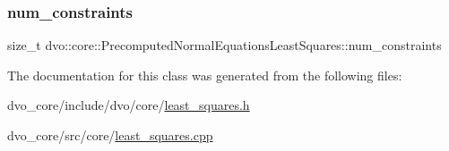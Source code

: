 \subsubsection{\texorpdfstring{num\+\_\+constraints}{num\_constraints}}
{\footnotesize\ttfamily size\+\_\+t dvo\+::core\+::\+Precomputed\+Normal\+Equations\+Least\+Squares\+::num\+\_\+constraints}



The documentation for this class was generated from the following files\+:\begin{DoxyCompactItemize}
\item 
dvo\+\_\+core/include/dvo/core/\mbox{\hyperlink{least__squares_8h}{least\+\_\+squares.\+h}}\item 
dvo\+\_\+core/src/core/\mbox{\hyperlink{least__squares_8cpp}{least\+\_\+squares.\+cpp}}\end{DoxyCompactItemize}
